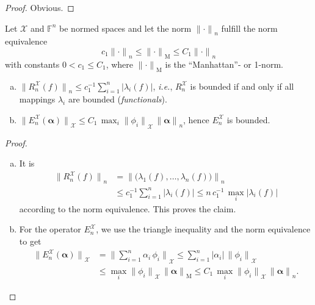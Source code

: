 \documentclass[a4paper]{paper}
\newcommand{\Spc}[1]{\mathscr{#1}}
\newcommand{\Field}{\mathbb{F}}
\newcommand*{\EXT}[2]{\ensuremath{E_{#1}^{#2}}}
\newcommand*{\REST}[2]{\ensuremath{R_{#1}^{#2}}}
\newcommand*{\RnX}{\ensuremath{\REST{n}{\Spc{X}}}}
\newcommand*{\EnX}{\ensuremath{\EXT{n}{\Spc{X}}}}
\newcommand*{\ABS}[1]{\ensuremath{\lvert#1\rvert}}
\newcommand*{\NORM}[1]{\ensuremath{\lVert #1 \rVert}}
\newcommand*{\NORMBig}[1]{\ensuremath{\Big\lVert #1 \Big\rVert}}
\newcommand*{\NORMLR}[1]{\ensuremath{\left\lVert #1 \right\rVert}}
\newcommand{\ie}{\textsl{i.e.}\xspace}
\newcommand{\valpha}{\boldsymbol{\alpha}}
\begin{document}
\begin{proof}
 Obvious.
\end{proof}


\begin{lemma}
 \label{lemma:specif:funct:op_prop_normedspace}
 Let $\Spc{X}$ and $\Field^n$ be normed spaces and let the norm $\NORM{\cdot}_n$ fulfill the norm equivalence
 \begin{equation*}
  c_1 \NORM{\cdot}_n \leq \NORM{\cdot}_{\mathrm{M}} \leq C_1 \NORM{\cdot}_n
 \end{equation*}
 with constants $0 < c_1 \leq C_1$, where $\NORM{\cdot}_{\mathrm{M}}$ is the ``Manhattan''- or 1-norm.

 \begin{enumerate}[(a)]
  \item $\NORM{\RnX(f)}_n \leq c_1^{-1} \sum_{i=1}^n \ABS{\lambda_i(f)}$, \ie, $\RnX$ is bounded if and only if all 
  mappings $\lambda_i$ are bounded (\emph{functionals}).
  \item $\NORM{\EnX(\valpha)}_{\Spc{X}} \leq C_1\, \max_i \NORM{\phi_i}_{\Spc{X}}\, \NORM{\valpha}_n$, hence $\EnX$ is 
  bounded.
 \end{enumerate}
\end{lemma}
\vspace{1em}


\begin{proof}~
 \begin{enumerate}[(a)]
  \item It is
  \begin{align*}
   \NORM{\RnX(f)}_n 
   &= \NORMLR{\big( \lambda_1(f), \ldots, \lambda_n(f) \big)}_n \\
   &\leq c_1^{-1} \sum_{i=1}^n \ABS{\lambda_i(f)} \leq n\,c_1^{-1}\, \max_i \ABS{\lambda_i(f)}
  \end{align*}
  according to the norm equivalence. This proves the claim.
  
  \item For the operator $\EnX$, we use the triangle inequality and the norm equivalence to get
  \begin{align*}
   \NORM{\EnX(\valpha)}_{\Spc{X}} 
   &= \NORMBig{\sum_{i=1}^n \alpha_i\, \phi_i}_{\Spc{X}} \leq \sum_{i=1}^n \ABS{\alpha_i}\, \NORM{\phi_i}_{\Spc{X}} \\
   &\leq \max_i \NORM{\phi_i}_{\Spc{X}}\, \NORM{\valpha}_{\mathrm{M}} \leq C_1\, \max_i \NORM{\phi_i}_{\Spc{X}}\, 
   \NORM{\valpha}_n.
  \end{align*}
 \end{enumerate}
\end{proof}
\end{document}
